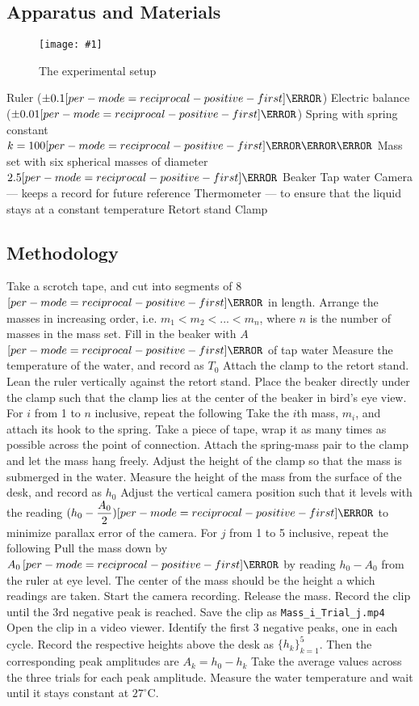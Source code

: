 \documentclass[a4paper,12pt]{article}
\let\oldsi\si
\renewcommand{\si}[1]{\oldsi[per-mode=reciprocal-positive-first]{#1}}
\newcommand{\degsym}{^{\circ}}
\newcommand{\img}[4]{\begin{center}
  \begin{figure}[H]
    \centering
    \texttt{[image: \#1]}
    \caption{#3}
    \label{fig:#4}
  \end{figure}
\end{center}}
\begin{document}
\pagebreak

\subsection{Apparatus and Materials}
\img{figs/setup.png}{0.8}{The experimental setup}{setup}
\begin{outline}[enumerate]
  \1 Ruler ($\pm 0.1\si{\cm}$)
  \1 Electric balance ($\pm 0.01\si{\g}$)
  \1 Spring with spring constant $k = 100\si{\N\per\m}$
  \1 Mass set with six spherical masses of diameter $2.5\si{\cm}$
  \1 Beaker
  \1 Tap water
  \1 Camera --- keeps a record for future reference
  \1 Thermometer --- to ensure that the liquid stays at a constant temperature
  \1 Retort stand
  \1 Clamp
\end{outline}

\subsection{Methodology}

\begin{outline}[enumerate]
  \1 Take a scrotch tape, and cut into segments of $8$ $\si{\cm}$ in length.
  \1 Arrange the masses in increasing order, i.e. $m_1 < m_2 < ... < m_n$, where $n$ is the number of masses in the mass set.
  \1 Fill in the beaker with $A$ $\si{\mL}$ of tap water
  \1 Measure the temperature of the water, and record as $T_0$
  \1 Attach the clamp to the retort stand.
  \1 Lean the ruler vertically against the retort stand.
  \1 Place the beaker directly under the clamp such that the clamp lies at the center of the beaker in bird's eye view.
  \1 For $i$ from 1 to $n$ inclusive, repeat the following
  \2 Take the $i$th mass, $m_i$, and attach its hook to the spring.
  \2 Take a piece of tape, wrap it as many times as possible across the point of connection.
  \2 Attach the spring-mass pair to the clamp and let the mass hang freely.
  \2 Adjust the height of the clamp so that the mass is submerged in the water.
  \2 Measure the height of the mass from the surface of the desk, and record as $h_0$
  \2 Adjust the vertical camera position such that it levels with the reading $(h_0 - \dfrac{A_0}{2}) \si{\cm}$ to minimize parallax error of the camera.
  \2 For $j$ from 1 to 5 inclusive, repeat the following
  \3 Pull the mass down by $A_0\,\si{\cm}$ by reading $h_0 - A_0$ from the ruler at eye level. The center of the mass should be the height a which readings are taken.
  \3 Start the camera recording.
  \3 Release the mass.
  \3 Record the clip until the 3rd negative peak is reached.
  \3 Save the clip as \verb|Mass_i_Trial_j.mp4|
  \3 Open the clip in a video viewer.
  \3 Identify the first 3 negative peaks, one in each cycle.
  \3 Record the respective heights above the desk as $\{h_k\}^{5}_{k=1}$.
  \3 Then the corresponding peak amplitudes are $A_k = h_0 - h_{k}$
  \2 Take the average values across the three trials for each peak amplitude.
  \2 Measure the water temperature and wait until it stays constant at $27\degsym \text{C}$.
\end{outline}
\end{document}
